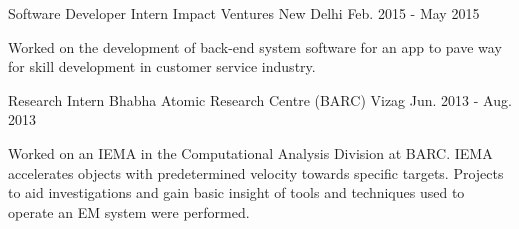 \begin{cventries}
  \cventry
    {Software Developer Intern}
    {Impact Ventures}
    {New Delhi}
    {Feb. 2015 - May 2015}
    {
	  \begin{cvitems}
		  \item {Worked on the development of back-end system software for an app to pave way for skill development in customer service industry.}
	  \end{cvitems} 
    }

  \cventry
   {Research Intern}
   {Bhabha Atomic Research Centre (BARC)}
   {Vizag}
   {Jun. 2013 - Aug. 2013}
   {
 	 \begin{cvitems}
 	 	\item {Worked on an IEMA in the Computational Analysis Division at BARC. IEMA accelerates objects with predetermined velocity towards specific targets. Projects to aid investigations and gain basic insight of tools and techniques used to operate an EM system were performed.}
 	 \end{cvitems}
   }

\end{cventries}
